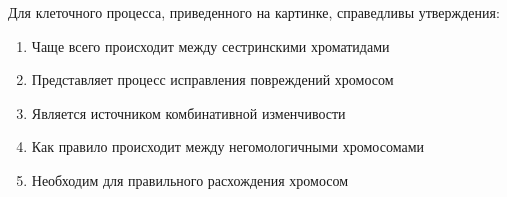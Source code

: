
Для клеточного процесса,
приведенного на картинке, справедливы утверждения:


\begin{enumerate}
    \item Чаще всего происходит между сестринскими хроматидами
    \item Представляет процесс исправления повреждений хромосом
    \item Является источником комбинативной изменчивости
    \item Как правило происходит между негомологичными хромосомами
    \item Необходим для правильного расхождения хромосом
\end{enumerate}


\explanationSection

